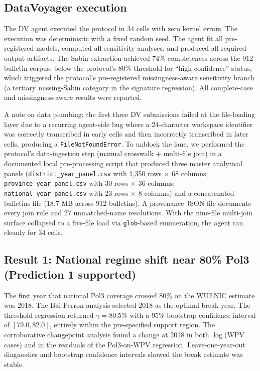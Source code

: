 \documentclass[11pt]{article}
\begin{document}
\subsection{DataVoyager execution}

The DV agent executed the protocol in 34 cells with zero kernel errors. The execution was deterministic with a fixed random seed. The agent fit all pre-registered models, computed all sensitivity analyses, and produced all required output artifacts. The Sabin extraction achieved 74\% completeness across the 912-bulletin corpus, below the protocol's 80\% threshold for ``high-confidence'' status, which triggered the protocol's pre-registered missingness-aware sensitivity branch (a tertiary missing-Sabin category in the signature regression). All complete-case and missingness-aware results were reported.

A note on data plumbing: the first three DV submissions failed at the file-loading layer due to a recurring agent-side bug where a 24-character workspace identifier was correctly transcribed in early cells and then incorrectly transcribed in later cells, producing a \texttt{FileNotFoundError}. To unblock the lane, we performed the protocol's data-ingestion step (manual crosswalk + multi-file join) in a documented local pre-processing script that produced three master analytical panels (\texttt{district\_year\_panel.csv} with 1{,}350 rows $\times$ 68 columns; \texttt{province\_year\_panel.csv} with 30 rows $\times$ 36 columns; \texttt{national\_year\_panel.csv} with 23 rows $\times$ 8 columns) and a concatenated bulletins file (18.7 MB across 912 bulletins). A provenance JSON file documents every join rule and 27 unmatched-name resolutions. With the nine-file multi-join surface collapsed to a five-file load via \texttt{glob}-based enumeration, the agent ran cleanly for 34 cells.

\subsection{Result 1: National regime shift near 80\% Pol3 (Prediction 1 supported)}

The first year that national Pol3 coverage crossed 80\% on the WUENIC estimate was 2018. The Bai-Perron analysis selected 2018 as the optimal break year. The threshold regression returned $\gamma{=}80.5\%$ with a 95\% bootstrap confidence interval of $[79.0, 82.0]$, entirely within the pre-specified support region. The corroborative changepoint analysis found a change at 2018 in both $\log$(WPV cases) and in the residuals of the Pol3-on-WPV regression. Leave-one-year-out diagnostics and bootstrap confidence intervals showed the break estimate was stable.
\end{document}
